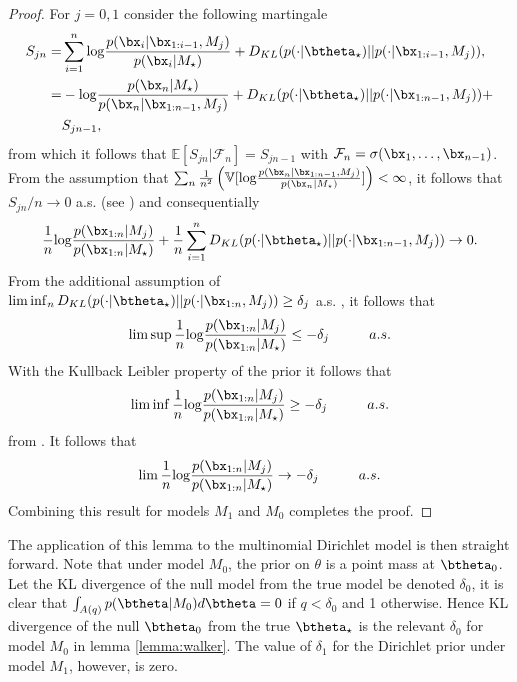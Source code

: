\documentclass[11pt]{article}
\def\log{{\rm log}}
\begin{document}
\begin{proof}
  For $j=0,1$ consider the following martingale
  \begin{align*}
    \label{eq:walker_martingale}
    S_{jn} =& \sum_{i=1}^{n} \log \frac{p(\bx_i|\bx_{1:i-1},M_j)}{p(\bx_i|M_\star)} + D_{KL}(p(\cdot|\btheta_\star)||p(\cdot|\bx_{1:i-1}, M_j) ),\\
    =& -\log \frac{p(\bx_n|M_\star)}{p(\bx_n|\bx_{1:n-1},M_j)} + D_{KL}(p(\cdot|\btheta_\star)||p(\cdot|\bx_{1:n-1}, M_j) ) +\\
    &S_{jn-1},\\
  \end{align*}
  from which it follows that $\mathbb{E}[S_{jn}|\mathcal{F}_n] = S_{jn-1}$ with $\mathcal{F}_n = \sigma(\bx_1,\dots,\bx_{n-1})$.
From the assumption that  $\sum_n \frac{1}{n^2} \left( \mathbb{V}[\log \frac{p(\bx_n|\bx_{1:n-1},M_j)}{p(\bx_n|M_\star )}]\right) < \infty$, it follows that $S_{jn}/n \rightarrow 0$ a.s. (see \cite {loeve})
and consequentially
  \begin{align*}
    \frac{1}{n} \log \frac{p(\bx_{1:n}|M_j)}{p(\bx_{1:n}|M_\star)} + \frac{1}{n}\sum_{i=1}^n  D_{KL}(p(\cdot|\btheta_\star)||p(\cdot|\bx_{1:n-1}, M_j) )\rightarrow 0.
  \end{align*}
  From the additional assumption of $\lim \inf_n D_{KL}(p(\cdot|\btheta_\star)||p(\cdot|\bx_{1:n}, M_j) ) \geq \delta_j$ a.s.
, it follows that
  \begin{align*}
    \lim \sup   \frac{1}{n} \log \frac{p(\bx_{1:n}|M_j)}{p(\bx_{1:n}|M_\star)} \leq - \delta_j \hspace{1cm} a.s.
  \end{align*}
  With the Kullback Leibler property of the prior it follows that
  \begin{align*}
     \lim \inf   \frac{1}{n} \log \frac{p(\bx_{1:n}|M_j)}{p(\bx_{1:n}|M_\star)} \geq - \delta_j \hspace{1cm} a.s.
  \end{align*}
  from \cite{barron}.
It follows that
    \begin{align*}
     \lim   \frac{1}{n} \log \frac{p(\bx_{1:n}|M_j)}{p(\bx_{1:n}|M_\star)} \rightarrow - \delta_j \hspace{1cm} a.s.
    \end{align*}
    Combining this result for models $M_1$ and $M_0$ completes the proof.
\end{proof}

The application of this lemma to the multinomial Dirichlet model is then straight forward.
Note that under model $M_0$, the prior on $\theta$ is a point mass at $\btheta_0$.
Let the KL divergence of the null model from the true model be denoted $\delta_0$, it is clear that $\int_{A(q)} p(\btheta|M_0) d\btheta = 0$ if $q<\delta_0$ and 1 otherwise.
Hence KL divergence of the null $\btheta_0$ from the true $\btheta_\star$ is the relevant $\delta_0$ for model $M_0$ in lemma \ref{lemma:walker}.
The value of $\delta_1$ for the Dirichlet prior under model $M_1$, however, is zero.
\end{document}
